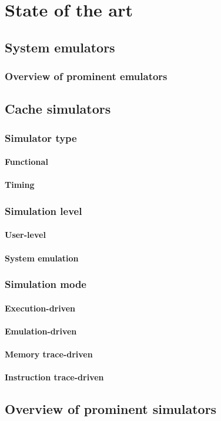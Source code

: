 
\chapter{State of the art}

\section{System emulators}
\subsection{Overview of prominent emulators}

%

\section{Cache simulators}
%
\subsection{Simulator type}
\subsubsection{Functional}
\subsubsection{Timing}
%
\subsection{Simulation level}
\subsubsection{User-level}
\subsubsection{System emulation}
%
\subsection{Simulation mode}
\subsubsection{Execution-driven}
\subsubsection{Emulation-driven}
\subsubsection{Memory trace-driven}
\subsubsection{Instruction trace-driven}

\section{Overview of prominent simulators}
%
